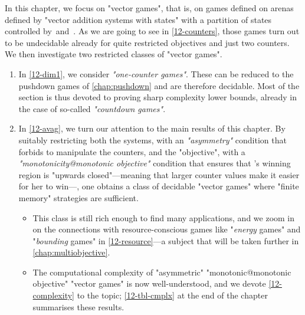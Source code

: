 In this chapter, we focus on "vector games", that is, on games defined
on arenas defined by "vector addition systems with states" with a
partition of states controlled by~\Eve and~\Adam.  As we are going to
see in \cref{12-counters}, those games turn out to be undecidable
already for quite restricted objectives and just two counters.  We
then investigate two restricted classes of "vector games".
\begin{enumerate}
\item In \cref{12-dim1}, we consider \emph{"one-counter games"}.  These can
  be reduced to the pushdown games of \cref{chap:pushdown} and are
  therefore decidable.  Most of the section is thus devoted to proving
  sharp complexity lower bounds, already in the case of so-called
  \emph{"countdown games"}.
\item In \cref{12-avag}, we turn our attention to the main results of
  this chapter.  By suitably restricting both
  the systems, with an
  \emph{"asymmetry"} condition that forbids \Adam to manipulate the
  counters, and
  the "objective", with a \emph{"monotonicity@monotonic objective"}
    condition that ensures that \Eve's winning region is "upwards
    closed"---meaning that larger counter values make it easier for
    her to win---,
  one obtains a class of decidable "vector games" where "finite
  memory" strategies are sufficient.
  \begin{itemize}
  \item
  This class is still rich enough to find many applications, and we
  zoom in on the connections with resource-conscious games like
  "\emph{energy} games" and "\emph{bounding} games" in
  \cref{12-resource}---a subject that will be taken further in
  \cref{chap:multiobjective}.
  
  \item
  The computational complexity of "asymmetric" "monotonic@monotonic
  objective" "vector games" is now well-understood, and we devote
  \cref{12-complexity} to the topic; \cref{12-tbl-cmplx} at the end of
  the chapter summarises these results.
  \end{itemize}
\end{enumerate}



